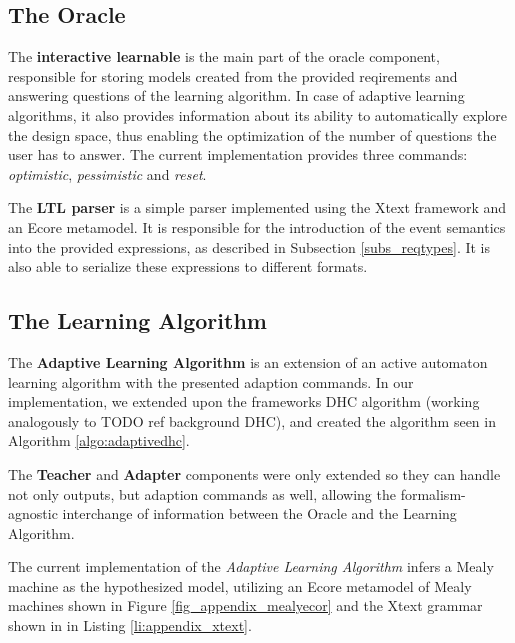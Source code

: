 \subsection{The Oracle} \label{subsec_oracleimpl}
The \textbf{interactive learnable} is the main part of the oracle component, responsible for storing models created from the provided reqirements and answering questions of the learning algorithm. In case of adaptive learning algorithms, it also provides information about its ability to automatically explore the design space, thus enabling the optimization of the number of questions the user has to answer. The current implementation provides three commands: \textit{optimistic}, \textit{pessimistic} and \textit{reset}.



The \textbf{LTL parser} is a simple parser implemented using the Xtext framework and an Ecore metamodel. It is responsible for the introduction of the event semantics into the provided expressions, as described in Subsection \ref{subs_reqtypes}. It is also able to serialize these expressions to different formats.

\subsection{The Learning Algorithm} \label{subsec_adaptivedhc}

The \textbf{Adaptive Learning Algorithm} is an extension of an active automaton learning algorithm with the presented adaption commands. In our implementation, we extended upon the frameworks DHC algorithm (working analogously to TODO ref background DHC), and created the algorithm seen in Algorithm \ref{algo:adaptivedhc}.

The \textbf{Teacher} and \textbf{Adapter} components were only extended so they can handle not only outputs, but adaption commands as well, allowing the formalism-agnostic interchange of information between the Oracle and the Learning Algorithm.

The current implementation of the \textit{Adaptive Learning Algorithm} infers a Mealy machine as the hypothesized model, utilizing an Ecore metamodel of Mealy machines shown in Figure \ref{fig_appendix_mealyecor} and the Xtext grammar shown in in Listing \ref{li:appendix_xtext}.



